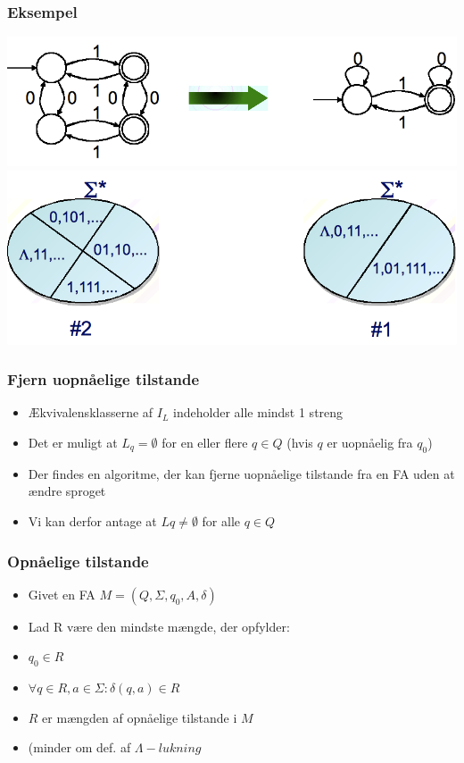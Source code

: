 \documentclass[]{beamer}
\begin{document}
\begin{frame}
  \frametitle{Eksempel}
\includegraphics[scale=0.4]{images/2_seminar_minimize}\\
\includegraphics[scale=0.4]{images/2_seminar_minimizeequiv}
\end{frame}

\begin{frame}
\frametitle{Fjern uopnåelige tilstande}
\begin{itemize}[<+->]
\item Ækvivalensklasserne af $I_L$ indeholder alle 
mindst 1 streng
\item Det er muligt at $L_q = \emptyset$ for en eller flere $q\in Q$
(hvis $q$ er uopnåelig fra $q_0$)
\item
Der findes en algoritme, der kan fjerne uopnåelige tilstande fra en FA uden at ændre sproget
\item
Vi kan derfor antage at $Lq \neq  \emptyset$ for alle $q\in Q$
\end{itemize}
\end{frame}

\begin{frame}
\frametitle{Opnåelige tilstande}
\begin{itemize}[<+->]
\item Givet en  FA $M=(Q, \Sigma , q_0, A, \delta)$
\item Lad R være den mindste mængde, der opfylder:
\item $q_0\in R$
\item $\forall q\in R, a\in \Sigma :  \delta (q, a)\in R$
\item $R$ er mængden af opnåelige tilstande i $M$
\item (minder om def. af $\Lambda-lukning$
\end{itemize}
\end{frame}
\end{document}
